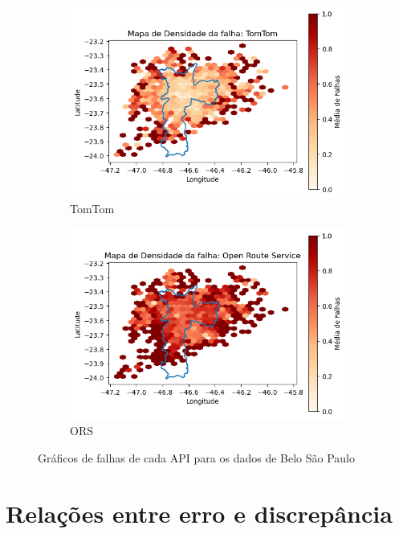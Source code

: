 \begin{figure}[ht]
  \begin{subfigure}[b]{0.45\textwidth}
    \includegraphics[width=\textwidth]{Figuras/falhasTomtomSP.png}
    \caption{TomTom}
    \label{fig:falhastomtomS}
  \end{subfigure}
  \hfill
  \begin{subfigure}[b]{0.45\textwidth}
    \includegraphics[width=\textwidth]{Figuras/falhasORSSP.png}
    \caption{ORS}
    \label{fig:falhasorsS}
  \end{subfigure}
  
  \caption{Gráficos de falhas de cada API para os dados de Belo São Paulo}
  \label{fig:falhas-global-sp}
\end{figure}

\section{Relações entre erro e discrepância}

